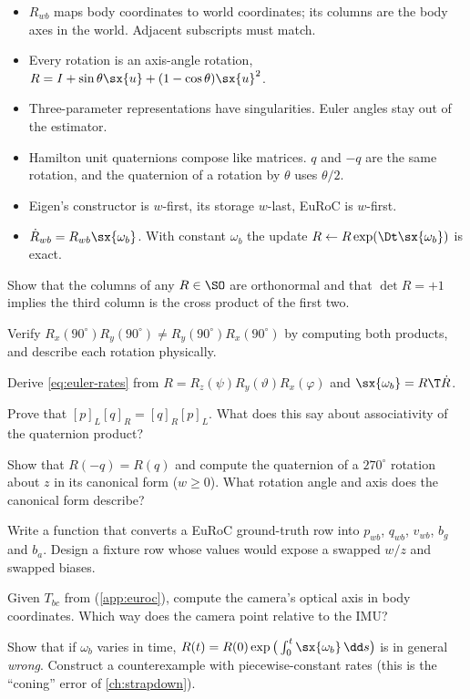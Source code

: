 \begin{takeaways}
\begin{itemize}
  \item $R_{wb}$ maps body coordinates to world coordinates; its columns are the body axes in the world.
        Adjacent subscripts must match.
  \item Every rotation is an axis-angle rotation, $R = I + \sin\theta\sx{u} + (1-\cos\theta)\sx{u}^2$.
  \item Three-parameter representations have singularities. Euler angles stay out of the estimator.
  \item Hamilton unit quaternions compose like matrices. $q$ and $-q$ are the same rotation, and the
        quaternion of a rotation by $\theta$ uses $\theta/2$.
  \item Eigen's constructor is $w$-first, its storage $w$-last, EuRoC is $w$-first.
  \item $\dot R_{wb} = R_{wb}\sx{\omega_b}$. With constant $\omega_b$ the update
        $R \leftarrow R\exp(\Dt\sx{\omega_b})$ is exact.
\end{itemize}
\end{takeaways}

\begin{exercises}
  \item Show that the columns of any $R \in \SO$ are orthonormal and that $\det R = +1$ implies the
        third column is the cross product of the first two.
  \item Verify $R_x(90^\circ)R_y(90^\circ) \neq R_y(90^\circ)R_x(90^\circ)$ by computing both products,
        and describe each rotation physically.
  \item Derive \eqref{eq:euler-rates} from $R = R_z(\psi)R_y(\vartheta)R_x(\varphi)$ and
        $\sx{\omega_b} = R\T\dot R$.
  \item Prove that $[p]_L[q]_R = [q]_R[p]_L$. What does this say about associativity of the quaternion
        product?
  \item Show that $R(-q) = R(q)$ and compute the quaternion of a $270^\circ$ rotation about $z$ in its
        canonical form ($w \ge 0$). What rotation angle and axis does the canonical form describe?
  \item Write a function that converts a EuRoC ground-truth row into $p_{wb}$, $q_{wb}$, $v_{wb}$, $b_g$
        and $b_a$. Design a fixture row whose values would expose a swapped $w/z$ and swapped biases.
  \item Given $T_{bc}$ from  (\cref{app:euroc}), compute the camera's optical axis
        in body coordinates. Which way does the camera point relative to the IMU?
  \item Show that if $\omega_b$ varies in time, $R(t) = R(0)\exp\big(\int_0^t\sx{\omega_b}\,\dd s\big)$ is
        in general \emph{wrong}. Construct a counterexample with piecewise-constant rates (this is the
        ``coning'' error of \cref{ch:strapdown}).
\end{exercises}
